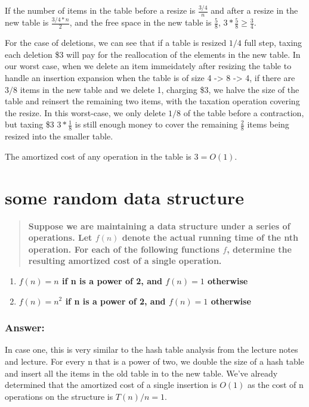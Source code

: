 \documentclass[titlepage]{article}\usepackage[]{graphicx}\usepackage[]{color}
\begin{document}
If the number of items in the table before a resize is $\frac{3/4}n$ and after a resize
in the new table is $\frac{3/4 *n}{2}$, and the free space in the new table is
$\frac{5}{8} $, $3 * \frac{5}{8} \geq \frac{3}{4}$. 

For the case of deletions, we can see that if a table is resized
$1/4$ full step, taxing each deletion \$3 will pay for the reallocation of the
elements in the new table. In our worst case, when we delete an item
immeidately after resizing the table to handle an insertion expansion when the
table is of size 4 -> 8 -> 4, if there are $3/8$ items in the new table and we
delete 1, charging \$3, we halve the size of the table and reinsert the
remaining two items, with the taxation operation covering the resize. In this
worst-case, we only delete $1/8$ of the table before a contraction, but taxing
\$3 $ 3* \frac{1}{8}$ is still enough money to cover the remaining
$\frac{2}{8}$ items being resized into the smaller table.

The amortized cost of any operation in the table is $3 = O(1)$.  


\section{some random data structure}
\begin{quote}
  \textbf{Suppose we are maintaining a data structure under a series of
  operations. Let $f(n)$ denote the actual running time of the nth operation.
For each of the following functions $f$, determine the resulting amortized cost
of a single operation.}
\end{quote}

\begin{enumerate}
  \item \textbf{ $f(n) = n$ if n is a power of 2, and $f(n) = 1$ otherwise}
  \item \textbf{ $f(n) = n^2$ if n is a power of 2, and $f(n) = 1$ otherwise}
\end{enumerate}

\subsubsection{Answer: }
In case one, this is very similar to the hash table analysis from the lecture
notes and lecture. For every n that is a power of two, we double the size of a
hash table and insert all the items in the old table in to the new table. We've
already determined that the amortized cost of a single insertion is $O(1)$ as
the cost of n operations on the structure is $T(n)/n = 1$. 
\end{document}

